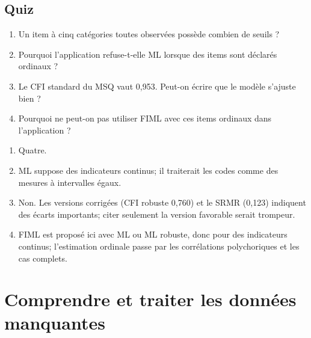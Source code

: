 \documentclass[
  french,
  11pt,
  a4paper,
  DIV=11,
  numbers=noendperiod]{scrreprt}
\providecommand{\tightlist}{%
  \setlength{\itemsep}{0pt}\setlength{\parskip}{0pt}}
\begin{document}
\section{Quiz}\label{quiz-7}

\begin{enumerate}
\def\labelenumi{\arabic{enumi}.}
\tightlist
\item
  Un item à cinq catégories toutes observées possède combien de seuils ?
\item
  Pourquoi l'application refuse-t-elle ML lorsque des items sont
  déclarés ordinaux ?
\item
  Le CFI standard du MSQ vaut 0,953. Peut-on écrire que le modèle
  s'ajuste bien ?
\item
  Pourquoi ne peut-on pas utiliser FIML avec ces items ordinaux dans
  l'application ?
\end{enumerate}

\begin{tcolorbox}[enhanced jigsaw, arc=.35mm, bottomrule=.15mm, bottomtitle=1mm, breakable, colback=white, colbacktitle=quarto-callout-tip-color!10!white, colframe=quarto-callout-tip-color-frame, coltitle=black, left=2mm, leftrule=.75mm, opacityback=0, opacitybacktitle=0.6, rightrule=.15mm, title={Réponses}, titlerule=0mm, toprule=.15mm, toptitle=1mm]

\begin{enumerate}
\def\labelenumi{\arabic{enumi}.}
\tightlist
\item
  Quatre.
\item
  ML suppose des indicateurs continus; il traiterait les codes comme des
  mesures à intervalles égaux.
\item
  Non. Les versions corrigées (CFI robuste 0,760) et le SRMR (0,123)
  indiquent des écarts importants; citer seulement la version favorable
  serait trompeur.
\item
  FIML est proposé ici avec ML ou ML robuste, donc pour des indicateurs
  continus; l'estimation ordinale passe par les corrélations
  polychoriques et les cas complets.
\end{enumerate}

\end{tcolorbox}


\chapter{Comprendre et traiter les données
manquantes}\label{sec-absences}
\end{document}
